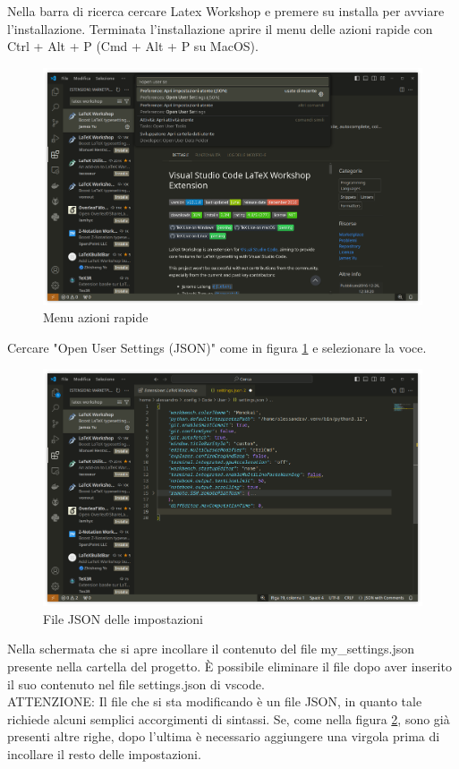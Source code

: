 \documentclass[envcountsame,envcountchap]{svmono}
\begin{document}
Nella barra di ricerca cercare Latex Workshop e premere su installa per avviare l'installazione.
Terminata l'installazione aprire il menu delle azioni rapide con Ctrl + Alt + P (Cmd + Alt + P su MacOS).
\begin{figure}[H]
    \centering
    \includegraphics[width=\linewidth]{images/vscode/vscode_user_settings.png}
    \caption{Menu azioni rapide}
    \label{menu_azioni_rapide}
\end{figure}
Cercare "Open User Settings (JSON)" come in figura \ref{menu_azioni_rapide} e selezionare la voce.
\begin{figure}[H]
    \centering
    \includegraphics[width=\linewidth]{images/vscode/vscode_settings_json.png}
    \caption{File JSON delle impostazioni}
    \label{json_impostazioni}
\end{figure}
Nella schermata che si apre incollare il contenuto del file my\_settings.json presente nella cartella del progetto.
È possibile eliminare il file dopo aver inserito il suo contenuto nel file settings.json di vscode.\\
ATTENZIONE: Il file che si sta modificando è un file JSON, in quanto tale richiede alcuni semplici accorgimenti di sintassi.
Se, come nella figura \ref{json_impostazioni}, sono già presenti altre righe, dopo l'ultima è necessario aggiungere una virgola prima di incollare il resto delle impostazioni.
\end{document}
